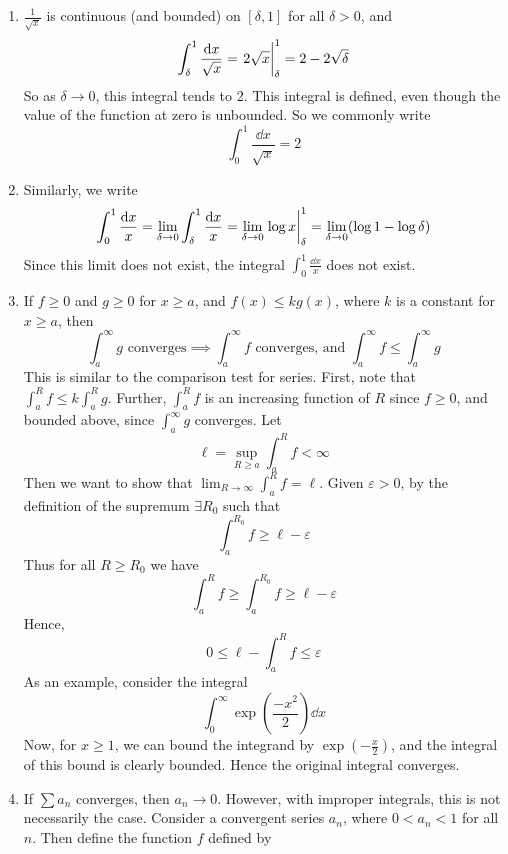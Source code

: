 \begin{enumerate}[(1)]
	\item \(\frac{1}{\sqrt{x}}\) is continuous (and bounded) on \([\delta, 1]\) for all \(\delta > 0\), and
	      \[
		      \int_\delta^1 \frac{\dd{x}}{\sqrt{x}} = \eval{2\sqrt{x}}_\delta^1 = 2 - 2\sqrt{\delta}
	      \]
	      So as \(\delta \to 0\), this integral tends to 2.
	      This integral is defined, even though the value of the function at zero is unbounded.
	      So we commonly write
	      \[
		      \int_0^1 \frac{\dd{x}}{\sqrt{x}} = 2
	      \]
	\item Similarly, we write
	      \[
		      \int_0^1 \frac{\dd{x}}{x} = \lim_{\delta \to 0} \int_\delta^1 \frac{\dd{x}}{x} = \lim_{\delta \to 0} \eval{\log x}_\delta^1 = \lim_{\delta \to 0} (\log 1 - \log \delta)
	      \]
	      Since this limit does not exist, the integral \(\int_0^1 \frac{\dd{x}}{x}\) does not exist.
	\item If \(f \geq 0\) and \(g \geq 0\) for \(x \geq a\), and \(f(x) \leq kg(x)\), where \(k\) is a constant for \(x \geq a\), then
	      \[
		      \int_a^\infty g \text{ converges} \implies \int_a^\infty f \text{ converges, and } \int_a^\infty f \leq \int_a^\infty g
	      \]
	      This is similar to the comparison test for series.
	      First, note that \(\int_a^R f \leq k \int_a^R g\).
	      Further, \(\int_a^R f\) is an increasing function of \(R\) since \(f \geq 0\), and bounded above, since \(\int_a^\infty g\) converges.
	      Let
	      \[
		      \ell = \sup_{R \geq a}\int_a^R f < \infty
	      \]
	      Then we want to show that \(\lim_{R \to \infty}\int_a^R f = \ell\).
	      Given \(\varepsilon > 0\), by the definition of the supremum \(\exists R_0\) such that
	      \[
		      \int_a^{R_0} f \geq \ell - \varepsilon
	      \]
	      Thus for all \(R\geq R_0\) we have
	      \[
		      \int_a^R f \geq \int_a^{R_0} f \geq \ell - \varepsilon
	      \]
	      Hence,
	      \[
		      0 \leq \ell - \int_a^R f \leq \varepsilon
	      \]
	      As an example, consider the integral
	      \[
		      \int_0^\infty \exp(\frac{-x^2}{2}) \dd{x}
	      \]
	      Now, for \(x \geq 1\), we can bound the integrand by \(\exp(-\frac{x}{2})\), and the integral of this bound is clearly bounded.
	      Hence the original integral converges.
	\item If \(\sum a_n\) converges, then \(a_n \to 0\).
	      However, with improper integrals, this is not necessarily the case.
	      Consider a convergent series \(a_n\), where \(0 < a_n < 1\) for all \(n\).
	      Then define the function \(f\) defined by

\end{enumerate}
